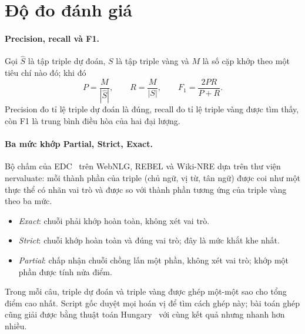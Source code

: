 \section{Độ đo đánh giá}\label{sec:bg-metrics}

\paragraph*{Precision, recall và F1.}
Gọi $\hat{S}$ là tập triple dự đoán, $S$ là tập triple vàng và $M$ là số cặp khớp theo một tiêu chí nào đó; khi đó
\begin{equation}
  P = \frac{M}{|\hat{S}|}, \qquad R = \frac{M}{|S|}, \qquad F_1 = \frac{2PR}{P + R}.
\end{equation}
Precision đo tỉ lệ triple dự đoán là đúng, recall đo tỉ lệ triple vàng được tìm thấy, còn F1 là trung bình điều hòa của hai đại lượng.

\paragraph*{Ba mức khớp Partial, Strict, Exact.}
Bộ chấm của EDC~\cite{zhang2024edc} trên WebNLG, REBEL và Wiki-NRE dựa trên thư viện nervaluate: mỗi thành phần của triple (chủ ngữ, vị từ, tân ngữ) được coi như một thực thể có nhãn vai trò và được so với thành phần tương ứng của triple vàng theo ba mức.
\begin{itemize}
  \item \emph{Exact}: chuỗi phải khớp hoàn toàn, không xét vai trò.
  \item \emph{Strict}: chuỗi khớp hoàn toàn và đúng vai trò; đây là mức khắt khe nhất.
  \item \emph{Partial}: chấp nhận chuỗi chồng lấn một phần, không xét vai trò; khớp một phần được tính nửa điểm.
\end{itemize}
Trong mỗi câu, triple dự đoán và triple vàng được ghép một-một sao cho tổng điểm cao nhất.
Script gốc duyệt mọi hoán vị để tìm cách ghép này; bài toán ghép cũng giải được bằng thuật toán Hungary~\cite{kuhn1955hungarian} với cùng kết quả nhưng nhanh hơn nhiều.
